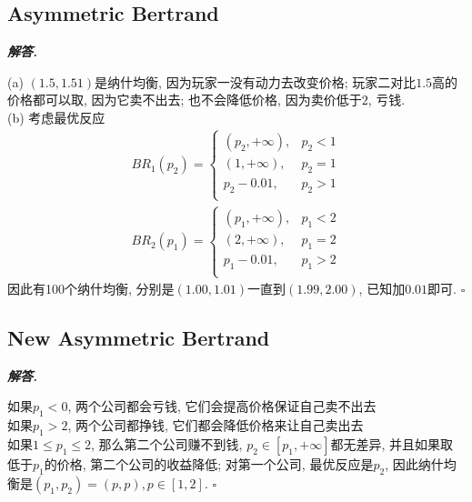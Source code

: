 \documentclass[10pt, a4paper, oneside]{ctexart}
\newenvironment{solution}{%
  \par\noindent\textbf{\textit{解答. }}\ignorespaces
}{%
  \hfill\ensuremath{\square}\par %
}
\begin{document}
\subsection{Asymmetric Bertrand}
\begin{solution}
(a) $(1.5,1.51)$是纳什均衡, 因为玩家一没有动力去改变价格; 玩家二对比$1.5$高的价格都可以取, 因为它卖不出去; 也不会降低价格, 因为卖价低于$2$, 亏钱.\\
(b) 考虑最优反应
\begin{align*} 
BR_1(p_2)=\begin{cases}
    (p_2,+\infty), &p_2<1\\
    (1,+\infty), &p_2=1\\
    p_2-0.01, &p_2>1\\
\end{cases}
\end{align*}
\begin{align*}
    BR_2(p_1)=\begin{cases}
        (p_1,+\infty), &p_1<2\\
        (2,+\infty), &p_1=2\\
        p_1-0.01, &p_1>2\\
    \end{cases}
    \end{align*}
因此有100个纳什均衡, 分别是$(1.00,1.01)$一直到$(1.99,2.00)$, 已知加$0.01$即可.
\end{solution}

\subsection{New Asymmetric Bertrand}
\begin{solution}
如果$p_1<0$, 两个公司都会亏钱, 它们会提高价格保证自己卖不出去\\
如果$p_1>2$, 两个公司都挣钱, 它们都会降低价格来让自己卖出去\\
如果$1\leq p_1\leq 2$, 那么第二个公司赚不到钱, $p_2\in[p_1,+\infty]$都无差异, 并且如果取低于$p_1$的价格, 第二个公司的收益降低; 对第一个公司, 最优反应是$p_2$, 因此纳什均衡是$(p_1,p_2)=(p,p), p\in[1,2]$.
\end{solution}
\end{document}
